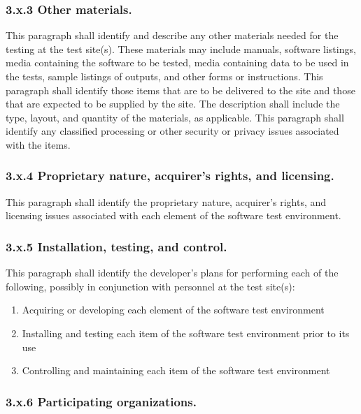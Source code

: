 \subsubsection{3.x.3 Other materials.}

This paragraph shall identify and describe any other materials needed
for the testing at the test site(s). These materials may include
manuals, software listings, media containing the software to be tested,
media containing data to be used in the tests, sample listings of
outputs, and other forms or instructions. This paragraph shall identify
those items that are to be delivered to the site and those that are
expected to be supplied by the site. The description shall include the
type, layout, and quantity of the materials, as applicable. This
paragraph shall identify any classified processing or other security or
privacy issues associated with the items.

\subsubsection{3.x.4 Proprietary nature, acquirer's rights, and
licensing.}

This paragraph shall identify the proprietary nature, acquirer's rights,
and licensing issues associated with each element of the software test
environment.

\subsubsection{3.x.5 Installation, testing, and control.}

This paragraph shall identify the developer's plans for performing each
of the following, possibly in conjunction with personnel at the test
site(s):

\begin{enumerate}
\itemsep1pt\parskip0pt
\item
  Acquiring or developing each element of the software test environment
\item
  Installing and testing each item of the software test environment
  prior to its use
\item
  Controlling and maintaining each item of the software test environment
\end{enumerate}

\subsubsection{3.x.6 Participating organizations.}

